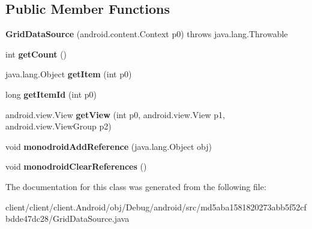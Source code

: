 \subsection*{Public Member Functions}
\begin{DoxyCompactItemize}
\item 
\hypertarget{classmd5aba1581820273abb5f52cfbdde47dc28_1_1GridDataSource_a6ad99fe851742b924c3f8d728513f2eb}{}{\bfseries Grid\+Data\+Source} (android.\+content.\+Context p0)  throws java.\+lang.\+Throwable 	\label{classmd5aba1581820273abb5f52cfbdde47dc28_1_1GridDataSource_a6ad99fe851742b924c3f8d728513f2eb}

\item 
\hypertarget{classmd5aba1581820273abb5f52cfbdde47dc28_1_1GridDataSource_abafd83e50c6cb446f6c5e7a524e79b08}{}int {\bfseries get\+Count} ()\label{classmd5aba1581820273abb5f52cfbdde47dc28_1_1GridDataSource_abafd83e50c6cb446f6c5e7a524e79b08}

\item 
\hypertarget{classmd5aba1581820273abb5f52cfbdde47dc28_1_1GridDataSource_af493f5c0a4fd48ac74a64635df446a10}{}java.\+lang.\+Object {\bfseries get\+Item} (int p0)\label{classmd5aba1581820273abb5f52cfbdde47dc28_1_1GridDataSource_af493f5c0a4fd48ac74a64635df446a10}

\item 
\hypertarget{classmd5aba1581820273abb5f52cfbdde47dc28_1_1GridDataSource_a5e1e74b3b059be5aeaae2518c08784ce}{}long {\bfseries get\+Item\+Id} (int p0)\label{classmd5aba1581820273abb5f52cfbdde47dc28_1_1GridDataSource_a5e1e74b3b059be5aeaae2518c08784ce}

\item 
\hypertarget{classmd5aba1581820273abb5f52cfbdde47dc28_1_1GridDataSource_a916a2fb6bd41b4a29c5ba5eb39f6e7f8}{}android.\+view.\+View {\bfseries get\+View} (int p0, android.\+view.\+View p1, android.\+view.\+View\+Group p2)\label{classmd5aba1581820273abb5f52cfbdde47dc28_1_1GridDataSource_a916a2fb6bd41b4a29c5ba5eb39f6e7f8}

\item 
\hypertarget{classmd5aba1581820273abb5f52cfbdde47dc28_1_1GridDataSource_ab0d1a428768a4bc9adc61dbe4e99ec87}{}void {\bfseries monodroid\+Add\+Reference} (java.\+lang.\+Object obj)\label{classmd5aba1581820273abb5f52cfbdde47dc28_1_1GridDataSource_ab0d1a428768a4bc9adc61dbe4e99ec87}

\item 
\hypertarget{classmd5aba1581820273abb5f52cfbdde47dc28_1_1GridDataSource_a9cfff86bffa1ab459c786cbd5f1083f5}{}void {\bfseries monodroid\+Clear\+References} ()\label{classmd5aba1581820273abb5f52cfbdde47dc28_1_1GridDataSource_a9cfff86bffa1ab459c786cbd5f1083f5}

\end{DoxyCompactItemize}


The documentation for this class was generated from the following file\+:\begin{DoxyCompactItemize}
\item 
client/client/client.\+Android/obj/\+Debug/android/src/md5aba1581820273abb5f52cfbdde47dc28/Grid\+Data\+Source.\+java\end{DoxyCompactItemize}
